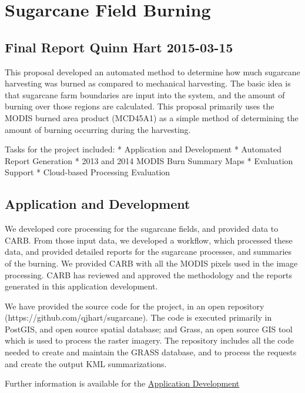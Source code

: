 \documentclass[]{article}
\author{}
\date{}
\begin{document}
\section{Sugarcane Field Burning}\label{sugarcane-field-burning}

\subsection{Final Report Quinn Hart
2015-03-15}\label{final-report-quinn-hart-2015-03-15}

This proposal developed an automated method to determine how much
sugarcane harvesting was burned as compared to mechanical harvesting.
The basic idea is that sugarcane farm boundaries are input into the
system, and the amount of burning over those regions are calculated.
This proposal primarily uses the MODIS burned area product (MCD45A1) as
a simple method of determining the amount of burning occurring during
the harvesting.

Tasks for the project included: * Application and Development *
Automated Report Generation * 2013 and 2014 MODIS Burn Summary Maps *
Evaluation Support * Cloud-based Processing Evaluation

\subsection{Application and
  Development}\label{application-and-development}

We developed core processing for the sugarcane fields, and provided data
to CARB. From those input data, we developed a workflow, which processed
these data, and provided detailed reports for the sugarcane processes,
and summaries of the burning. We provided CARB with all the MODIS pixels
used in the image processing. CARB has reviewed and approved the
methodology and the reports generated in this application development.

We have provided the source code for the project, in an open repository
(https://github.com/qjhart/sugarcane). The code is executed primarily in
PostGIS, and open source spatial database; and Grass, an open source GIS
tool which is used to process the raster imagery. The repository
includes all the code needed to create and maintain the GRASS database,
and to process the requests and create the output KML summarizations.

Further information is available for the 
\href{Application\%20Development}{Application Development}
\end{document}
